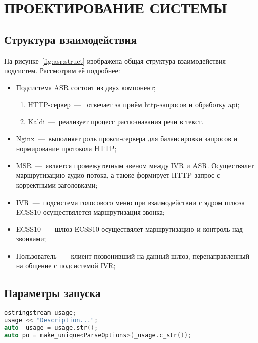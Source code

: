 \chapter{ПРОЕКТИРОВАНИЕ СИСТЕМЫ}

\section{Структура взаимодействия}

На рисунке~\ref{fig:asr:struct} изображена общая структура взаимодействия подсистем.
Рассмотрим её подробнее:
\begin{itemize}
    \item Подсистема ASR состоит из двух компонент;
    \begin{enumerate}
        \item HTTP-сервер~---~ отвечает за приём http-запросов и обработку api;
        \item Kaldi~---~реализует процесс распознавания речи в текст.
    \end{enumerate}
    \item Nginx~---~выполняет роль прокси-сервера для балансировки запросов и
        нормирование протокола HTTP;
    \item MSR~---~является промежуточным звеном между IVR и ASR. Осуществялет маршрутизацию
        аудио-потока, а также формирует HTTP-запрос с корректными заголовками;
    \item IVR~---~подсистема голосового меню при взаимодействии с ядром шлюза ECSS10
        осуществялется маршрутизация звонка;
    \item ECSS10~---~шлюз ECSS10 осуществялет маршрутизацию и контроль над звонками;
    \item Пользователь~---~клиент позвонивший на данный шлюз, перенаправленный на
        общение с подсистемой IVR;
\end{itemize}

\section{Параметры запуска}
\begin{lstlisting}[caption={Обработка аргументов},label={asr:init:options},language=C++]
ostringstream usage;
usage << "Description...";
auto _usage = usage.str();
auto po = make_unique<ParseOptions>(_usage.c_str());

\end{lstlisting}


